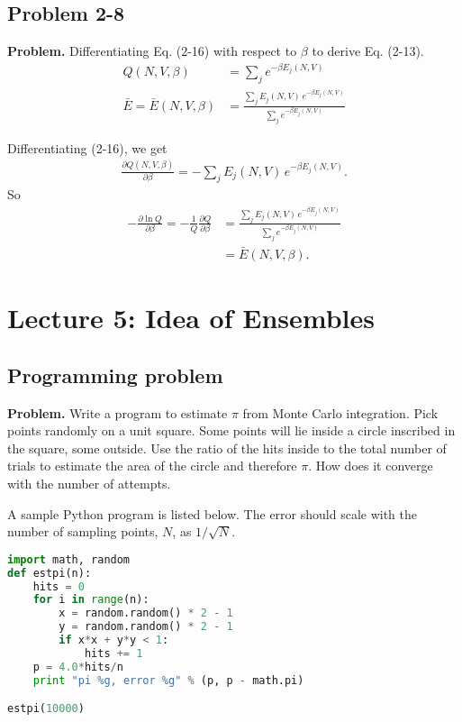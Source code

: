 \documentclass[twocolumn, 10pt]{article}
\numberwithin{equation}{section}
\newenvironment{problem}
{\par\medskip\sffamily \color{problue}
  \textbf{Problem. }\ignorespaces}
{\medskip}
\newenvironment{solution}[1][\empty]
{\par\medskip
  \textbf{\ifx\empty#1{Solution.}\relax\else{#1}\fi} \ignorespaces}
{\medskip}
\begin{document}
\subsection{Problem 2-8}

\begin{problem}
  Differentiating Eq. (2-16) with respect to $\beta$
  to derive Eq. (2-13).
  \begin{align}
    Q(N, V, \beta)
    &= \sum_j e^{-\beta E_j(N, V)}
    \tag{2-16}
    \\
    \bar E = \bar E(N, V, \beta)
    &=
    \frac{ \sum_j E_j(N, V) \, e^{-\beta E_j(N, V)} }
         { \sum_j e^{-\beta E_j(N, V) } }
    \tag{2-13}
  \end{align}
\end{problem}

\begin{solution}
Differentiating (2-16), we get
\begin{align*}
  \frac{ \partial Q(N, V, \beta) } { \partial \beta }
  = -\sum_j E_j(N, V) \, e^{-\beta E_j(N, V)}.
\end{align*}
So
\begin{align*}
  -\frac{ \partial \ln Q } { \partial \beta }
  =
  -\frac{1}{Q}
  \frac{ \partial Q } { \partial \beta }
  &=
  \frac{ \sum_j E_j(N, V) \, e^{-\beta E_j(N, V)} }
       { \sum_j e^{-\beta E_j(N, V)} }
  \\
  &=\bar E(N, V, \beta)
  .
\end{align*}
\end{solution}


\section{Lecture 5: Idea of Ensembles}

\subsection{Programming problem}

\begin{problem}
Write a program to estimate $\pi$ from Monte Carlo integration.
%
Pick points randomly on a unit square.
%
Some points will lie inside a circle inscribed in the square,
some outside.
%
Use the ratio of the hits inside to the total number of trials
to estimate the area of the circle and therefore $\pi$.
%
How does it converge with the number of attempts.
\end{problem}

\begin{solution}
A sample Python program is listed below.
The error should scale
with the number of sampling points, $N$,
as $1/\sqrt N$.

\begin{lstlisting}[language=Python]
import math, random
def estpi(n):
    hits = 0
    for i in range(n):
        x = random.random() * 2 - 1
        y = random.random() * 2 - 1
        if x*x + y*y < 1:
            hits += 1
    p = 4.0*hits/n
    print "pi %g, error %g" % (p, p - math.pi)

estpi(10000)
\end{lstlisting}
\end{solution}
\end{document}
